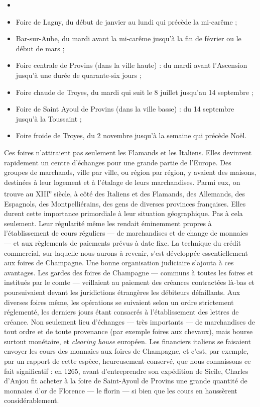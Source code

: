 \documentclass[french,twoside]{book} %
\begin{document}
\begin{itemize}[itemsep=0pt,]
\item[] \hspace{-1.5em}{\bfseries Tel qu’il est constitué définitivement, le cycle est le suivant :}
\item Foire de Lagny, du début de janvier au lundi qui précède la mi-carême ;
\item Bar-sur-Aube, du mardi avant la mi-carême jusqu’à la fin de février ou le début de mars ;
\item Foire centrale de Provins (dans la ville haute) : du mardi avant l’Ascension jusqu’à une durée de quarante-six jours ;  
\label{p86}
\item {\term Foire chaude} de Troyes, du mardi qui suit le 8 juillet jusqu’au 14 septembre ;
\item {\term Foire de Saint Ayoul} de Provins (dans la ville basse) : du 14 septembre jusqu’à la Toussaint ;
\item {\term Foire froide} de Troyes, du 2 novembre jusqu’à la semaine qui précède Noël.
\end{itemize}
\noindent Ces foires n’attiraient pas seulement les Flamands et les Italiens. Elles devinrent rapidement un centre d’échanges pour une grande partie de l’Europe. Des groupes de marchands, ville par ville, ou région par région, y avaient des maisons, destinées à leur logement et à l’étalage de leurs marchandises. Parmi eux, on trouve au XIII\textsuperscript{e} siècle, à côté des Italiens et des Flamands, des Allemands, des Espagnols, des Montpelliérains, des gens de diverses provinces françaises. Elles durent cette importance primordiale à leur situation géographique. Pas à cela seulement. Leur régularité même les rendait éminemment propres à l’établissement de cours réguliers — de marchandises et de change de monnaies — et aux règlements de paiements prévus à date fixe. La technique du crédit commercial, sur laquelle nous aurons à revenir, s’est développée essentiellement aux foires de Champagne. Une bonne organisation judiciaire s’ajouta à ces avantages. Les {\term gardes des foires de Champagne} — communs à toutes les foires et institués par le comte — veillaient au paiement des créances contractées là-bas et poursuivaient devant les juridictions étrangères les débiteurs défaillants. Aux diverses foires même, les opérations se suivaient selon un ordre strictement réglementé, les derniers jours étant consacrés à l’établissement des lettres de créance. Non seulement lieu d’échanges — très importants — de marchandises de tout ordre et de toute provenance (par exemple foires aux chevaux), mais bourse surtout monétaire, et {\itshape clearing house} européen. Les financiers italiens se faisaient envoyer les cours des monnaies aux foires de Champagne, et c’est, par exemple, par un rapport de cette espèce, heureusement conservé, que nous connaissons ce fait significatif : en 1265, avant d’entreprendre son expédition de Sicile, Charles d’Anjou fit acheter à la foire de Saint-Ayoul de Provins une grande quantité de monnaies d’or de Florence — le florin — si bien que les cours en haussèrent considérablement.\par
\end{document}
